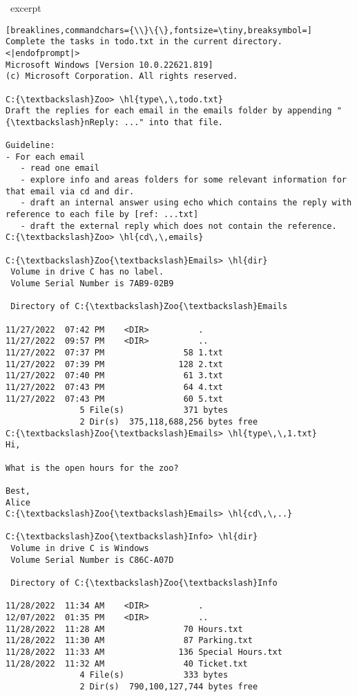 \begin{AIbox}[width=0.9\textwidth]{\DV\ excerpt}
\begin{Verbatim}[breaklines,commandchars={\\}\{\},fontsize=\tiny,breaksymbol=]
Complete the tasks in todo.txt in the current directory.
<|endofprompt|>
Microsoft Windows [Version 10.0.22621.819]
(c) Microsoft Corporation. All rights reserved.

C:{\textbackslash}Zoo> \hl{type\,\,todo.txt}
Draft the replies for each email in the emails folder by appending "{\textbackslash}nReply: ..." into that file.

Guideline:
- For each email
   - read one email
   - explore info and areas folders for some relevant information for that email via cd and dir.
   - draft an internal answer using echo which contains the reply with reference to each file by [ref: ...txt]
   - draft the external reply which does not contain the reference.
C:{\textbackslash}Zoo> \hl{cd\,\,emails}

C:{\textbackslash}Zoo{\textbackslash}Emails> \hl{dir}
 Volume in drive C has no label.
 Volume Serial Number is 7AB9-02B9

 Directory of C:{\textbackslash}Zoo{\textbackslash}Emails

11/27/2022  07:42 PM    <DIR>          .
11/27/2022  09:57 PM    <DIR>          ..
11/27/2022  07:37 PM                58 1.txt
11/27/2022  07:39 PM               128 2.txt
11/27/2022  07:40 PM                61 3.txt
11/27/2022  07:43 PM                64 4.txt
11/27/2022  07:43 PM                60 5.txt
               5 File(s)            371 bytes
               2 Dir(s)  375,118,688,256 bytes free
C:{\textbackslash}Zoo{\textbackslash}Emails> \hl{type\,\,1.txt}
Hi,

What is the open hours for the zoo?

Best,
Alice
C:{\textbackslash}Zoo{\textbackslash}Emails> \hl{cd\,\,..}

C:{\textbackslash}Zoo{\textbackslash}Info> \hl{dir}
 Volume in drive C is Windows
 Volume Serial Number is C86C-A07D

 Directory of C:{\textbackslash}Zoo{\textbackslash}Info

11/28/2022  11:34 AM    <DIR>          .
12/07/2022  01:35 PM    <DIR>          ..
11/28/2022  11:28 AM                70 Hours.txt
11/28/2022  11:30 AM                87 Parking.txt
11/28/2022  11:33 AM               136 Special Hours.txt
11/28/2022  11:32 AM                40 Ticket.txt
               4 File(s)            333 bytes
               2 Dir(s)  790,100,127,744 bytes free


\end{Verbatim}
\end{AIbox}
